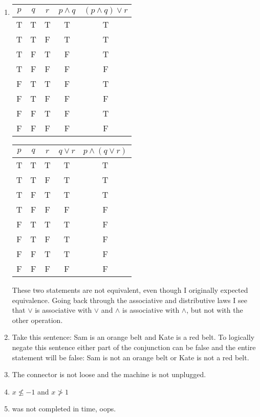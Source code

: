 \documentclass[12pt]{article}
\begin{document}
\begin{enumerate}
\pagebreak{}
\setcounter{enumi}{22}
\item %
\begin{tabular} {|c|c|c||c|c|}
\hline
$p$ & $q$ & $r$ & $p \wedge q$ & $(p \wedge q) \vee r$\\ \hline
T & T & T & T & T\\
T & T & F & T & T\\
T & F & T & F & T\\
T & F & F & F & F\\ 
F & T & T & F & T\\
F & T & F & F & F\\
F & F & T & F & T\\
F & F & F & F & F\\ \hline
\end{tabular}

\begin{tabular} {|c|c|c||c|c|}
\hline
$p$ & $q$ & $r$ & $q \vee r$ & $p \wedge (q \vee r)$\\ \hline
T & T & T & T & T\\
T & T & F & T & T\\
T & F & T & T & T\\
T & F & F & F & F\\ 
F & T & T & T & F\\
F & T & F & T & F\\
F & F & T & T & F\\
F & F & F & F & F\\ \hline
\end{tabular}

These two statements are not equivalent, even though I originally expected
equivalence. Going back through the associative and distributive laws
I see that $\vee$ is associative with $\vee$ and $\wedge$ is
associative with $\wedge$, but not with the other operation.
\setcounter{enumi}{25}
\item %
Take this sentence: Sam is an orange belt and Kate is a red
  belt. To logically negate this sentence either part of the
  conjunction can be false and the entire statement will be false: Sam
  is not an orange belt or Kate is not a red belt.

\item %
The connector is not loose and the machine is not unplugged.

\setcounter{enumi}{34}
\item $x \not \leq -1$ and $x \not > 1$

\setcounter{enumi}{49}
\item was not completed in time, oops.
\end{enumerate}
\end{document}
